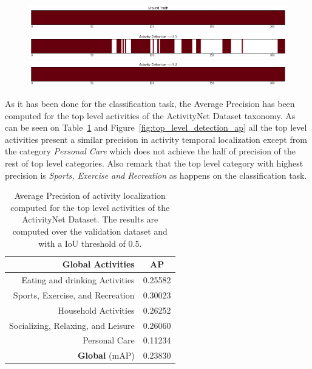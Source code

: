 \begin{figure}[H]
\begin{center}
\includegraphics[width=1\linewidth]{img/results/activity_threshold_effect_1}
\includegraphics[width=1\linewidth]{img/results/activity_threshold_effect_2}
\includegraphics[width=1\linewidth]{img/results/activity_threshold_effect_3}
\end{center}
\caption{}
\label{fig:activty_threshold_effect}
\end{figure}

As it has been done for the classification task, the Average Precision has been computed for the top level activities of the ActivityNet Dataset taxonomy. As can be seen on Table~\ref{table:top_level_detection_ap} and Figure~\ref{fig:top_level_detection_ap} all the top level activities present a similar precision in activity temporal localization except from the category \textit{Personal Care} which does not achieve the half of precision of the rest of top level categories. Also remark that the top level category with highest precision is \textit{Sports, Exercise and Recreation} as happens on the classification task.

\begin{table}[H]
\begin{center}
\begin{tabular}{|r|c|}
\hline
\textbf{Global Activities} & \textbf{AP} \\
\hline\hline
Eating and drinking Activities & 0.25582 \\
Sports, Exercise, and Recreation & 0.30023 \\
Household Activities & 0.26252 \\
Socializing, Relaxing, and Leisure & 0.26060 \\
Personal Care & 0.11234 \\
\hline\hline
\textbf{Global} (mAP) & 0.23830 \\
\hline
\end{tabular}
\end{center}
\caption{Average Precision of activity localization computed for the top level activities of the ActivityNet Dataset. The results are computed over the validation dataset and with a IoU threshold of 0.5.}
\label{table:top_level_detection_ap}
\end{table}

